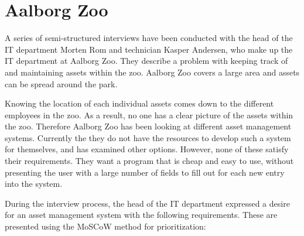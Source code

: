 \chapter{Aalborg Zoo}\label{ch:problemdefinition}
A series of semi-structured interviews have been conducted with the head of the IT department Morten Rom and technician Kasper Andersen, who make up the IT department at Aalborg Zoo. They describe a problem with keeping track of and maintaining assets within the zoo. Aalborg Zoo covers a large area and assets can be spread around the park. 
\par
Knowing the location of each individual assets comes down to the different employees in the zoo. As a result, no one has a clear picture of the assets within the zoo. Therefore Aalborg Zoo has been looking at different asset management systems. Currently the they do not have the resources to develop such a system for themselves, and has examined other options. However, none of these satisfy their requirements. They want a program that is cheap and easy to use, without presenting the user with a large number of fields to fill out for each new entry into the system. 
\par
During the interview process, the head of the IT department expressed a desire for an asset management system with the following requirements. These are presented using the MoSCoW method for prioritization:
\par





    
    
    

